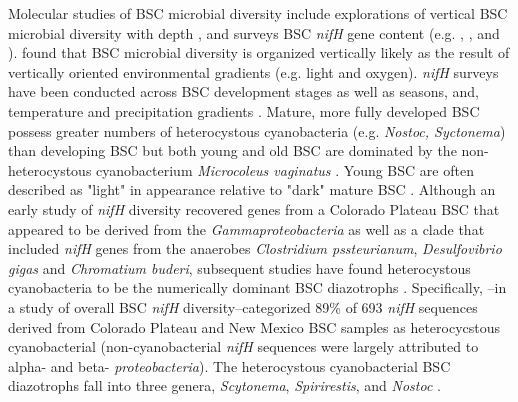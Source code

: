 Molecular studies of BSC microbial diversity include explorations of vertical BSC microbial diversity with depth \cite{Garcia_Pichel_2003}, and surveys BSC \textit{nifH} gene content (e.g. \citet{14766579}, \citet{Yeager_2012}, \citet{Yeager} and \citet{Steppe_1996}). \citet{Garcia_Pichel_2003} found that BSC microbial diversity is organized vertically likely as the result of vertically oriented environmental gradients (e.g. light and oxygen). \textit{nifH} surveys have been conducted across BSC development stages \cite{14766579} as well as seasons, and,  temperature and precipitation gradients \cite{Yeager_2012}. Mature, more fully developed BSC possess greater numbers of heterocystous cyanobacteria (e.g. \textit{Nostoc, Syctonema}) than developing BSC but both young and old BSC are dominated by the non-heterocystous cyanobacterium \textit{Microcoleus vaginatus} \cite{14766579}. Young BSC are often described as "light" in appearance relative to "dark" mature BSC \cite{Belnap_2002}.  Although an early study of \textit{nifH} diversity recovered genes from a Colorado Plateau BSC that appeared to be derived from the \textit{Gammaproteobacteria} as well as a clade that included \textit{nifH} genes from the anaerobes \textit{Clostridium pssteurianum}, \textit{Desulfovibrio gigas} and \textit{Chromatium buderi}, subsequent studies have found heterocystous cyanobacteria to be the numerically dominant BSC diazotrophs \cite{Yeager, 14766579, Yeager_2012}. Specifically, \citet{Yeager}--in a study of overall BSC \textit{nifH} diversity--categorized 89\% of 693 \textit{nifH} sequences derived from Colorado Plateau and New Mexico BSC samples as heterocycstous cyanobacterial (non-cyanobacterial \textit{nifH} sequences were largely attributed to alpha- and beta- \textit{proteobacteria}). The heterocystous cyanobacterial BSC diazotrophs fall into three genera, \textit{Scytonema}, \textit{Spirirestis}, and \textit{Nostoc} \cite{Yeager, Yeager_2012}.


